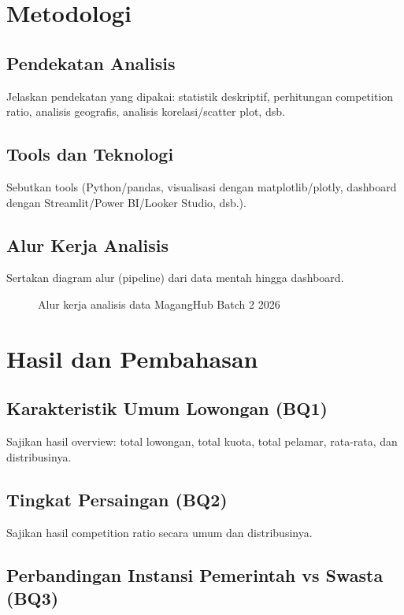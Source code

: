 \documentclass[11pt,a4paper]{report}
\begin{document}
\chapter{Metodologi}

\section{Pendekatan Analisis}
Jelaskan pendekatan yang dipakai: statistik deskriptif, perhitungan competition ratio, analisis geografis, analisis korelasi/scatter plot, dsb.

\section{Tools dan Teknologi}
Sebutkan tools (Python/pandas, visualisasi dengan matplotlib/plotly, dashboard dengan Streamlit/Power BI/Looker Studio, dsb.).

\section{Alur Kerja Analisis}
Sertakan diagram alur (pipeline) dari data mentah hingga dashboard.

\begin{figure}[H]
\centering
\caption{Alur kerja analisis data MagangHub Batch 2 2026}
\label{fig:pipeline}
\end{figure}

\chapter{Hasil dan Pembahasan}

\section{Karakteristik Umum Lowongan (BQ1)}
Sajikan hasil overview: total lowongan, total kuota, total pelamar, rata-rata, dan distribusinya.

\section{Tingkat Persaingan (BQ2)}
Sajikan hasil competition ratio secara umum dan distribusinya.

\section{Perbandingan Instansi Pemerintah vs Swasta (BQ3)}
\end{document}
